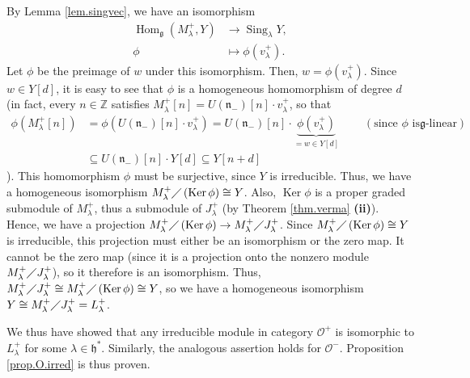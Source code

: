 \documentclass
[numbers=enddot,12pt,final,onecolumn,german,notitlepage]{scrartcl}%
\theoremstyle{definition}
\begin{document}
By Lemma \ref{lem.singvec}, we have an isomorphism%
\begin{align*}
\operatorname*{Hom}\nolimits_{\mathfrak{g}}\left(  M_{\lambda}^{+},Y\right)
&  \rightarrow\operatorname*{Sing}\nolimits_{\lambda}Y,\\
\phi &  \mapsto\phi\left(  v_{\lambda}^{+}\right)  .
\end{align*}
Let $\phi$ be the preimage of $w$ under this isomorphism. Then, $w=\phi\left(
v_{\lambda}^{+}\right)  $. Since $w\in Y\left[  d\right]  $, it is easy to see
that $\phi$ is a homogeneous homomorphism of degree $d$ (in fact, every
$n\in\mathbb{Z}$ satisfies $M_{\lambda}^{+}\left[  n\right]  =U\left(
\mathfrak{n}_{-}\right)  \left[  n\right]  \cdot v_{\lambda}^{+}$, so that%
\begin{align*}
\phi\left(  M_{\lambda}^{+}\left[  n\right]  \right)   &  =\phi\left(
U\left(  \mathfrak{n}_{-}\right)  \left[  n\right]  \cdot v_{\lambda}%
^{+}\right)  =U\left(  \mathfrak{n}_{-}\right)  \left[  n\right]
\cdot\underbrace{\phi\left(  v_{\lambda}^{+}\right)  }_{=w\in Y\left[
d\right]  }\ \ \ \ \ \ \ \ \ \ \left(  \text{since }\phi\text{ is
}\mathfrak{g}\text{-linear}\right) \\
&  \subseteq U\left(  \mathfrak{n}_{-}\right)  \left[  n\right]  \cdot
Y\left[  d\right]  \subseteq Y\left[  n+d\right]
\end{align*}
). This homomorphism $\phi$ must be surjective, since $Y$ is irreducible.
Thus, we have a homogeneous isomorphism $M_{\lambda}^{+}\diagup\left(
\operatorname*{Ker}\phi\right)  \cong Y$. Also, $\operatorname*{Ker}\phi$ is a
proper graded submodule of $M_{\lambda}^{+}$, thus a submodule of $J_{\lambda
}^{+}$ (by Theorem \ref{thm.verma} \textbf{(ii)}). Hence, we have a projection
$M_{\lambda}^{+}\diagup\left(  \operatorname*{Ker}\phi\right)  \rightarrow
M_{\lambda}^{+}\diagup J_{\lambda}^{+}$. Since $M_{\lambda}^{+}\diagup\left(
\operatorname*{Ker}\phi\right)  \cong Y$ is irreducible, this projection must
either be an isomorphism or the zero map. It cannot be the zero map (since it
is a projection onto the nonzero module $M_{\lambda}^{+}\diagup J_{\lambda
}^{+}$), so it therefore is an isomorphism. Thus, $M_{\lambda}^{+}\diagup
J_{\lambda}^{+}\cong M_{\lambda}^{+}\diagup\left(  \operatorname*{Ker}%
\phi\right)  \cong Y$, so we have a homogeneous isomorphism $Y\cong
M_{\lambda}^{+}\diagup J_{\lambda}^{+}=L_{\lambda}^{+}$.

We thus have showed that any irreducible module in category $\mathcal{O}^{+}$
is isomorphic to $L_{\lambda}^{+}$ for some $\lambda\in\mathfrak{h}^{\ast}$.
Similarly, the analogous assertion holds for $\mathcal{O}^{-}$. Proposition
\ref{prop.O.irred} is thus proven.
\end{document}
